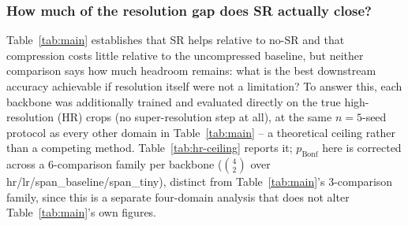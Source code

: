 \documentclass[11pt]{article}
\begin{document}
\subsubsection{How much of the resolution gap does SR actually close?}
\label{sec:hr-ceiling}

Table~\ref{tab:main} establishes that SR helps relative to no-SR and that compression costs little relative to the uncompressed baseline, but neither comparison says how much headroom remains: what is the best downstream accuracy achievable if resolution itself were not a limitation? To answer this, each backbone was additionally trained and evaluated directly on the true high-resolution (HR) crops (no super-resolution step at all), at the same $n{=}5$-seed protocol as every other domain in Table~\ref{tab:main} -- a theoretical ceiling rather than a competing method. Table~\ref{tab:hr-ceiling} reports it; $p_{\text{Bonf}}$ here is corrected across a 6-comparison family per backbone ($\binom{4}{2}$ over hr/lr/span\_baseline/span\_tiny), distinct from Table~\ref{tab:main}'s 3-comparison family, since this is a separate four-domain analysis that does not alter Table~\ref{tab:main}'s own figures.
\end{document}
